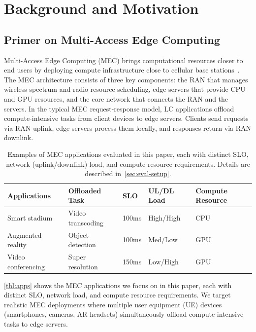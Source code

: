 \section{Background and Motivation}
\label{sec:motivation}

\subsection{Primer on Multi-Access Edge Computing}
\label{sec:primer}

Multi-Access Edge Computing (MEC) brings computational resources closer to end users by deploying compute infrastructure close to cellular base stations~\cite{etsi-mec}.
The MEC architecture consists of three key components: the RAN that manages wireless spectrum and radio resource scheduling, edge servers that provide CPU and GPU resources, and the core network that connects the RAN and the servers.
In the typical MEC request-response model, LC applications offload compute-intensive tasks from client devices to edge servers.
Clients send requests via RAN uplink, edge servers process them locally, and responses return via RAN downlink.

\begin{table}[]
\setlength{\tabcolsep}{4pt}
\renewcommand{\arraystretch}{1.0}
\footnotesize
\centering
\begin{tabular}{@{}p{2.1cm}p{2.0cm}p{0.8cm}p{1.2cm}p{1.2cm}@{}}
\toprule
\textbf{Applications} & \textbf{Offloaded Task} & \textbf{SLO} & \textbf{UL/DL Load} & \textbf{Compute Resource} \\ \midrule
Smart stadium~\cite{www-orange-5gstadium} & Video transcoding & 100ms & High/High & CPU \\
Augmented reality~\cite{mao2019delay, padmanabhan2023gemel} & Object detection & 100ms & Med/Low & GPU \\
Video conferencing~\cite{www-zoom-latency, www-wikipedia-audio-latency} & Super resolution & 150ms & Low/High & GPU \\ \bottomrule
\end{tabular}
\caption{Examples of MEC applications evaluated in this paper, each with distinct SLO, network (uplink/downlink) load, and compute resource requirements. Details are described in~\autoref{sec:eval-setup}.}
\label{tbl:apps}
\vspace{-1em}
\end{table}

\autoref{tbl:apps} shows the MEC applications we focus on in this paper, each with distinct SLO, network load, and compute resource requirements.
We target realistic MEC deployments where multiple user equipment (UE) devices (\eg smartphones, cameras, AR headsets) simultaneously offload compute-intensive tasks to edge servers.


